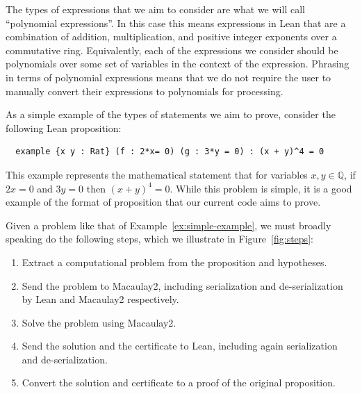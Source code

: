 \documentclass[runningheads]{llncs}
\begin{document}
The types of expressions that we aim to consider are what we will call ``polynomial expressions''. In this case this means expressions in Lean that are a combination of addition, multiplication, and positive integer exponents over a commutative ring. Equivalently, each of the expressions we consider should be polynomials over some set of variables in the context of the expression. Phrasing in terms of polynomial expressions means that we do not require the user to manually convert their expressions to polynomials for processing.

\begin{example}
  \label{ex:simple-example}
  As a simple example of the types of statements we aim to prove, consider the following Lean proposition:
\begin{verbatim}
  example {x y : Rat} (f : 2*x= 0) (g : 3*y = 0) : (x + y)^4 = 0
\end{verbatim}
This example represents the mathematical statement that for variables $x,y\in \mathbb{Q}$, if $2x = 0$ and $3y = 0$ then $(x+y)^4=0$. While this problem is simple, it is a good example of the format of proposition that our current code aims to prove.
\end{example}

Given a problem like that of Example~\ref{ex:simple-example}, we must broadly speaking do the following steps, which we illustrate in Figure~\ref{fig:steps}:

\begin{enumerate}
\item Extract a computational problem from the proposition and hypotheses.
\item Send the problem to Macaulay2, including serialization and de-serialization by Lean and Macaulay2 respectively.
\item Solve the problem using Macaulay2.
\item Send the solution and the certificate to Lean, including again serialization and de-serialization.
\item Convert the solution and certificate to a proof of the original proposition.
\end{enumerate}
\end{document}
